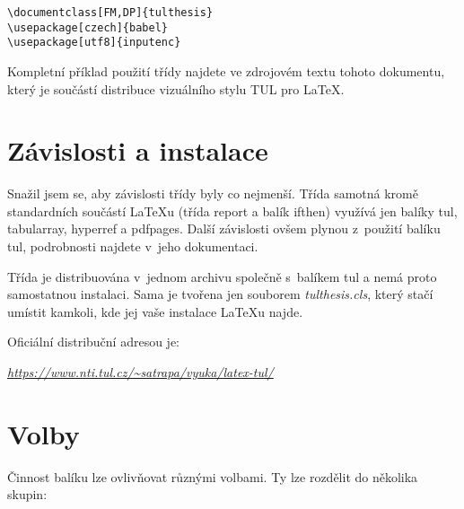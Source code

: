\documentclass[FM,DP,fonts]{tulthesis}
\newcommand{\argument}[1]{{\ttfamily\color{\tulcolor}#1}}
\newenvironment{myquote}{\begin{list}{}{\setlength\leftmargin\parindent}\item[]}{\end{list}}
\newenvironment{listing}{\begin{myquote}\color{\tulcolor}}{\end{myquote}}
\begin{document}
\begin{listing}
\begin{verbatim}
\documentclass[FM,DP]{tulthesis}
\usepackage[czech]{babel}
\usepackage[utf8]{inputenc}
\end{verbatim}
\end{listing}

Kompletní příklad použití třídy najdete ve zdrojovém textu tohoto dokumentu,
který je součástí distribuce vizuálního stylu TUL pro \LaTeX.


\chapter{Závislosti a instalace}

Snažil jsem se, aby závislosti třídy byly co nejmenší. Třída samotná kromě
standardních součástí \LaTeX u (třída \argument{report} a balík
\argument{ifthen}) využívá jen balíky \argument{tul}, \argument{tabularray},
\argument{hyperref} a \argument{pdfpages}. Další závislosti ovšem plynou
z~použití balíku \argument{tul}, podrobnosti najdete v~jeho dokumentaci.

Třída je distribuována v~jednom archivu společně s~balíkem \argument{tul} a
nemá proto samostatnou instalaci. Sama je tvořena jen souborem
\emph{tulthesis.cls}, který stačí umístit kamkoli, kde jej vaše instalace
\LaTeX u najde. 

Oficiální distribuční adresou je:

\begin{listing}
\href{https://www.nti.tul.cz/~satrapa/vyuka/latex-tul/}{\emph{https://www.nti.tul.cz/\textasciitilde satrapa/vyuka/latex-tul/}}
\end{listing}


\chapter{Volby}\label{volby}

Činnost balíku lze ovlivňovat různými volbami. Ty lze rozdělit do několika
skupin:
\end{document}
